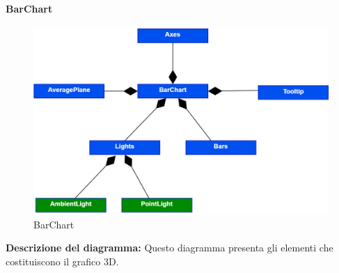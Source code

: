 \paragraph{BarChart}
\begin{figure}[h!] \centering
      \includegraphics[scale=0.3]{template/images/uml_front/ui/BarChart.png}
      \caption{BarChart}
\end{figure}
\textbf{Descrizione del diagramma:}
Questo diagramma presenta gli elementi che costituiscono il grafico 3D.
